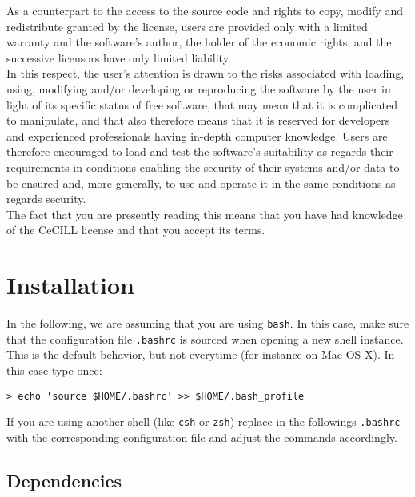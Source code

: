 \documentclass[10pt,french,english,a4paper]{article}
\begin{document}
As a counterpart to the access to the source code and rights to copy,
modify and redistribute granted by the license, users are provided only
with a limited warranty and the software's author, the holder of the
economic rights, and the successive licensors have only limited
liability.\\

In this respect, the user's attention is drawn to the risks associated
with loading, using, modifying and/or developing or reproducing the
software by the user in light of its specific status of free software,
that may mean that it is complicated to manipulate, and that also
therefore means that it is reserved for developers and experienced
professionals having in-depth computer knowledge. Users are therefore
encouraged to load and test the software's suitability as regards their
requirements in conditions enabling the security of their systems and/or
data to be ensured and, more generally, to use and operate it in the
same conditions as regards security.\\

The fact that you are presently reading this means that you have had
knowledge of the CeCILL license and that you accept its terms.

\section{Installation}

In the following, we are assuming that you are using \texttt{bash}.
In this case, make sure that the configuration file \texttt{.bashrc} is sourced when
opening a new shell instance. This is the default behavior, but not everytime
(for instance on Mac OS X). In this case type once:
\begin{Verbatim}[frame=single]
  > echo 'source $HOME/.bashrc' >> $HOME/.bash_profile
\end{Verbatim}
If you are using another shell (like \texttt{csh} or \texttt{zsh}) replace
in the followings \texttt{.bashrc} with the corresponding configuration file
and adjust the commands accordingly.

\subsection{Dependencies}
\end{document}
